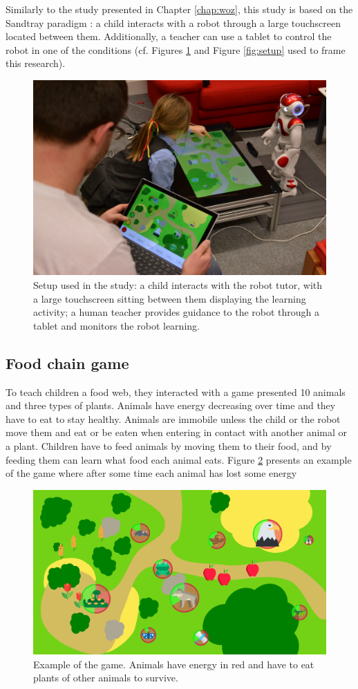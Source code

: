 Similarly to the study presented in Chapter \ref{chap:woz}, this study is based on the Sandtray paradigm \citep{baxter2012touchscreen}: a child interacts with a robot through a large touchscreen located between them. Additionally, a teacher can use a tablet to control the robot in one of the conditions (cf. Figures \ref{fig:tutoring_setup} and Figure \ref{fig:setup} used to frame this research).

\begin{figure}[ht]
	\centering
	\includegraphics[width=.5\textwidth]{setup.jpg}
	\caption{Setup used in the study: a child interacts with the robot tutor, with a large touchscreen sitting between them displaying the learning activity; a human teacher provides guidance to the robot through a tablet and monitors the robot learning.}
	\label{fig:tutoring_setup}
\end{figure}



\subsection{Food chain game}
To teach children a food web, they interacted with a game presented 10 animals and three types of plants. Animals have energy decreasing over time and they have to eat to stay healthy. Animals are immobile unless the child or the robot move them and eat or be eaten when entering in contact with another animal or a plant. Children have to feed animals by moving them to their food, and by feeding them can learn what food each animal eats. Figure \ref{fig:tutoring_game} presents an example of the game where after some time each animal has lost some energy

\begin{figure}[ht]
	\centering
		\includegraphics[width=1\textwidth]{game.png}
		\captionsetup{width=.9\linewidth}
		\caption{Example of the game. Animals have energy in red and have to eat plants of other animals to survive.}
		\label{fig:tutoring_game}
\end{figure}

